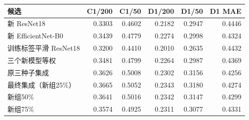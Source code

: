 \begin{tabular}{lrrrrr}
\toprule
候选 & C1/200 & C1/50 & D1/200 & D1/50 & D1 MAE \\
\midrule
新 ResNet18 & 0.3303 & 0.4602 & 0.2182 & 0.2947 & 0.4446 \\
新 EfficientNet-B0 & 0.3439 & 0.4779 & 0.2274 & 0.2998 & 0.4324 \\
训练标签平滑 ResNet18 & 0.3200 & 0.4410 & 0.2010 & 0.2635 & 0.4432 \\
三个新模型等权 & 0.3481 & 0.4799 & 0.2264 & 0.2987 & 0.4369 \\
原三种子集成 & 0.3626 & 0.5008 & 0.2302 & 0.3156 & 0.4256 \\
最终集成（新组25\%） & 0.3665 & 0.5052 & 0.2343 & 0.3180 & 0.4274 \\
新组50\% & 0.3641 & 0.5016 & 0.2342 & 0.3147 & 0.4299 \\
新组75\% & 0.3574 & 0.4925 & 0.2311 & 0.3077 & 0.4331 \\
\bottomrule
\end{tabular}